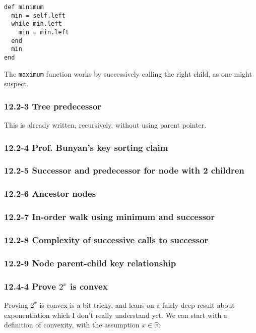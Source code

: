 \documentclass{article}
\begin{document}
\begin{lstlisting}[frame=single]
def minimum
  min = self.left
  while min.left
    min = min.left
  end
  min
end
\end{lstlisting}

The \texttt{maximum} function works by successively calling the right
child, as one might suspect.

\subsubsection{12.2-3 Tree predecessor}

This is already written, recursively, without using parent pointer.


\subsubsection{12.2-4 Prof. Bunyan's key sorting claim}

\subsubsection{12.2-5 Successor and predecessor for node with 2 children}

\subsubsection{12.2-6 Ancestor nodes}

\subsubsection{12.2-7 In-order walk using minimum and successor}

\subsubsection{12.2-8 Complexity of successive calls to successor}

\subsubsection{12.2-9 Node parent-child key relationship}


\subsubsection{12.4-4 Prove $2^x$ is convex}

Proving $2^x$ is convex is a bit tricky, and leans on a fairly deep result about
exponentiation which I don't really understand yet. We can start with a definition
of convexity, with the assumption $x\in\mathbb{R}$:
\end{document}
